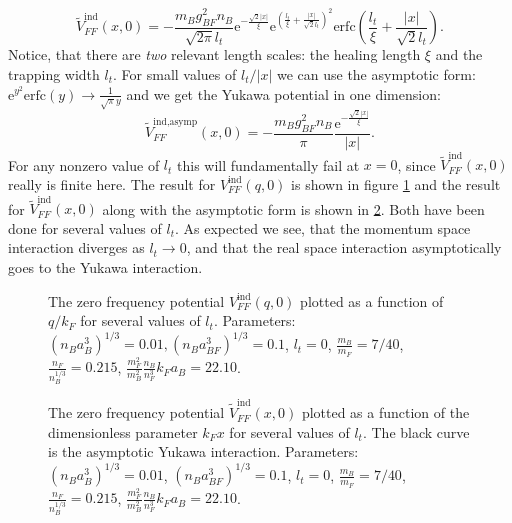 \begin{equation}
\tilde{V}_{FF}^\text{ind}(x,0) = -\frac{m_Bg_{BF}^2n_B}{\sqrt{2\pi} l_t} \text{e}^{-\frac{\sqrt{2}|x|}{\xi}}\text{e}^{\left(\frac{l_t}{\xi}+\frac{|x|}{\sqrt{2}l_t}\right)^2}\text{erfc}\left(\frac{l_t}{\xi}+\frac{|x|}{\sqrt{2}l_t}\right).
\label{eq.VFFx_exact}
\end{equation}
Notice, that there are \textit{two} relevant length scales: the healing length $\xi$ and the trapping width $l_t$. For small values of $l_t/|x|$ we can use the asymptotic form: $\text{e}^{y^2}\text{erfc}(y) \to \frac{1}{\sqrt{\pi}y}$ and we get the Yukawa potential in one dimension:
\begin{equation}
\tilde{V}_{FF}^\text{ind,asymp}(x,0) = -\frac{m_Bg_{BF}^2n_B}{\pi}\frac{\text{e}^{-\frac{\sqrt{2}|x|}{\xi}}}{|x|}.
\label{eq.Vx_asymp}
\end{equation}
For any nonzero value of $l_t$ this will fundamentally fail at $x=0$, since $\tilde{V}_{FF}^\text{ind}(x,0)$ really is finite here. The result for $V_{FF}^\text{ind}(q,0)$ is shown in figure \ref{fig.Vq} and the result for $\tilde{V}_{FF}^\text{ind}(x,0)$ along with the asymptotic form is shown in \ref{fig.Vx}. Both have been done for several values of $l_t$. As expected we see, that the momentum space interaction diverges as $l_t \to 0$, and that the real space interaction asymptotically goes to the Yukawa interaction.

\begin{figure} 
\begin{center}  
  
\caption{The zero frequency potential $V_{FF}^\text{ind}(q,0)$ plotted as a function of $q/k_F$ for several values of $l_t$. Parameters: $(n_Ba_B^3)^{1/3} = 0.01, (n_Ba_{BF}^3)^{1/3} = 0.1$, $l_t = 0$, $\frac{m_B}{m_F} = 7/40$, $\frac{n_F}{n_B^{1/3}} = 0.215$, $\frac{m_F^2}{m_B^2}\frac{n_B}{n_F^3} k_Fa_B = 22.10$.}  
\label{fig.Vq}  
\end{center}    
\end{figure}

\begin{figure} 
\begin{center}  
  
\caption{The zero frequency potential $\tilde{V}_{FF}^\text{ind}(x,0)$ plotted as a function of the dimensionless parameter $k_Fx$ for several values of $l_t$. The black curve is the asymptotic Yukawa interaction. Parameters: $(n_Ba_B^3)^{1/3} = 0.01$, $(n_Ba_{BF}^3)^{1/3} = 0.1$, $l_t = 0$, $\frac{m_B}{m_F} = 7/40$, $\frac{n_F}{n_B^{1/3}} = 0.215$, $\frac{m_F^2}{m_B^2}\frac{n_B}{n_F^3} k_Fa_B = 22.10$.}  
\label{fig.Vx}  
\end{center}    
\end{figure}


